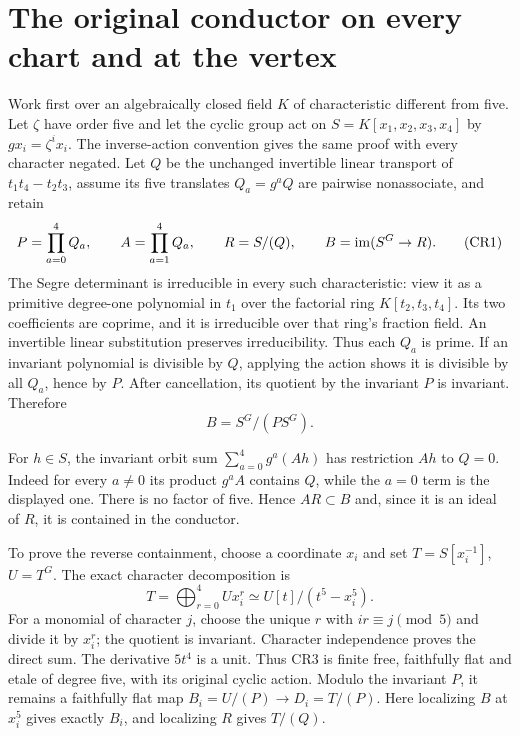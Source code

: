 \section{The original conductor on every chart and at the vertex}
Work first over an algebraically closed field $K$ of characteristic
different from five.  Let $\zeta$ have order five and let the cyclic
group act on $S=K[x_1,x_2,x_3,x_4]$ by $g x_i=\zeta^i x_i$.
The inverse-action convention gives the same proof with every character
negated.  Let $Q$ be the unchanged invertible linear transport of
$t_1t_4-t_2t_3$, assume its five translates $Q_a=g^aQ$ are pairwise
nonassociate, and retain
\[
 P=\prod_{a=0}^4Q_a,\qquad A=\prod_{a=1}^4Q_a,\qquad
 R=S/(Q),\qquad B=\operatorname{im}(S^G\to R).                              \tag{CR1}
\]
The Segre determinant is irreducible in every such characteristic:
view it as a primitive degree-one polynomial in $t_1$ over the
factorial ring $K[t_2,t_3,t_4]$.  Its two coefficients are coprime,
and it is irreducible over that ring's fraction field.  An invertible
linear substitution preserves irreducibility.  Thus each $Q_a$ is
prime.  If an invariant polynomial is divisible by $Q$, applying
the action shows it is divisible by all $Q_a$, hence by $P$.
After cancellation, its quotient by the invariant $P$ is invariant.
Therefore
\[
 B=S^G/(P S^G).                                                \tag{CR2}
\]

For $h\in S$, the invariant orbit sum $\sum_{a=0}^4g^a(Ah)$ has
restriction $Ah$ to $Q=0$.  Indeed for every $a\ne0$ its product
$g^aA$ contains $Q$, while the $a=0$ term is the displayed one.
There is no factor of five.  Hence $AR\subset B$ and, since it
is an ideal of $R$, it is contained in the conductor.

To prove the reverse containment, choose a coordinate $x_i$ and set
$T=S[x_i^{-1}]$, $U=T^G$.  The exact character decomposition is
\[
 T=\bigoplus_{r=0}^4 U x_i^r
   \simeq U[t]/(t^5-x_i^5).                                   \tag{CR3}
\]
For a monomial of character $j$, choose the unique $r$ with
$ir\equiv j\pmod5$ and divide it by $x_i^r$; the quotient is
invariant.  Character independence proves the direct sum.  The
derivative $5t^4$ is a unit.  Thus CR3 is finite free, faithfully
flat and etale of degree five, with its original cyclic action.
Modulo the invariant $P$, it remains a faithfully flat map
$B_i=U/(P)\to D_i=T/(P)$.  Here localizing $B$ at $x_i^5$
gives exactly $B_i$, and localizing $R$ gives $T/(Q)$.

